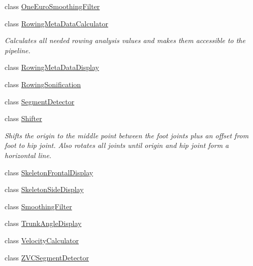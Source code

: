 \begin{DoxyCompactItemize}
\item 
class \hyperlink{class_rowing_monitor_1_1_model_1_1_pipeline_1_1_one_euro_smoothing_filter}{One\+Euro\+Smoothing\+Filter}
\item 
class \hyperlink{class_rowing_monitor_1_1_model_1_1_pipeline_1_1_rowing_meta_data_calculator}{Rowing\+Meta\+Data\+Calculator}
\begin{DoxyCompactList}\small\item\em Calculates all needed rowing analysis values and makes them accessible to the pipeline. \end{DoxyCompactList}\item 
class \hyperlink{class_rowing_monitor_1_1_model_1_1_pipeline_1_1_rowing_meta_data_display}{Rowing\+Meta\+Data\+Display}
\item 
class \hyperlink{class_rowing_monitor_1_1_model_1_1_pipeline_1_1_rowing_sonification}{Rowing\+Sonification}
\item 
class \hyperlink{class_rowing_monitor_1_1_model_1_1_pipeline_1_1_segment_detector}{Segment\+Detector}
\item 
class \hyperlink{class_rowing_monitor_1_1_model_1_1_pipeline_1_1_shifter}{Shifter}
\begin{DoxyCompactList}\small\item\em Shifts the origin to the middle point between the foot joints plus an offset from foot to hip joint. Also rotates all joints until origin and hip joint form a horizontal line. \end{DoxyCompactList}\item 
class \hyperlink{class_rowing_monitor_1_1_model_1_1_pipeline_1_1_skeleton_frontal_display}{Skeleton\+Frontal\+Display}
\item 
class \hyperlink{class_rowing_monitor_1_1_model_1_1_pipeline_1_1_skeleton_side_display}{Skeleton\+Side\+Display}
\item 
class \hyperlink{class_rowing_monitor_1_1_model_1_1_pipeline_1_1_smoothing_filter}{Smoothing\+Filter}
\item 
class \hyperlink{class_rowing_monitor_1_1_model_1_1_pipeline_1_1_trunk_angle_display}{Trunk\+Angle\+Display}
\item 
class \hyperlink{class_rowing_monitor_1_1_model_1_1_pipeline_1_1_velocity_calculator}{Velocity\+Calculator}
\item 
class \hyperlink{class_rowing_monitor_1_1_model_1_1_pipeline_1_1_z_v_c_segment_detector}{Z\+V\+C\+Segment\+Detector}
\end{DoxyCompactItemize}
